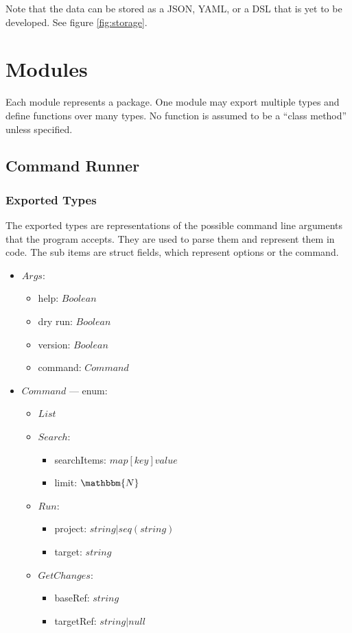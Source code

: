 \documentclass[11pt]{article}
\begin{document}
Note that the data can be stored as a JSON, YAML, or a DSL that is yet to be
developed. See figure \ref{fig:storage}.


\newpage
\section{Modules}
\label{sec:modules}

Each module represents a package. One module may export multiple types and
define functions over many types. No function is assumed to be a ``class method''
unless specified.

\subsection{Command Runner}
\label{mod:command}

\subsubsection{Exported Types}

The exported types are representations of the possible command line arguments
that the program accepts. They are used to parse them and represent them in
code. The sub items are struct fields, which represent options or the command.

\begin{itemize}
\item $Args$:
  \begin{itemize}
  \item help: $Boolean$
  \item dry run: $Boolean$
  \item version: $Boolean$
  \item command: $Command$
  \end{itemize}
\item $Command$ --- enum:
  \begin{itemize}
  \item $List$
  \item $Search$:
    \begin{itemize}
    \item searchItems: $map[key]value$

    \item limit: $\mathbbm{N}$
    \end{itemize}
  \item $Run$:
    \begin{itemize}
    \item project: $string | seq(string)$
    \item target: $string$
    \end{itemize}
  \item $GetChanges$:
    \begin{itemize}
    \item baseRef: $string$
    \item targetRef: $string | null$
    \end{itemize}
  \end{itemize}
\end{itemize}
\end{document}
